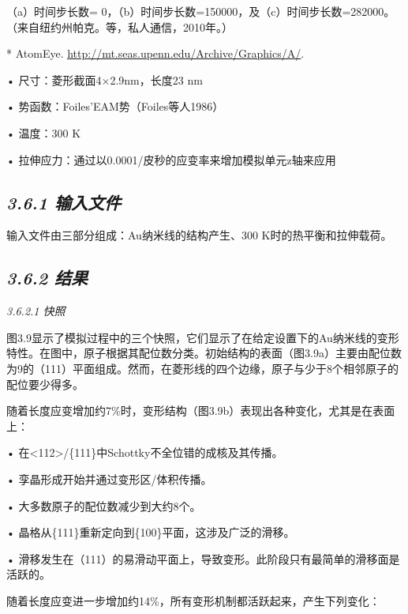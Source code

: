 （a）时间步长数=
0，（b）时间步长数=150000，及（c）时间步长数=282000。（来自纽约州帕克。等，私人通信，2010年。）

* AtomEye.
\href{http://mt.seas.upenn.edu/Archive/Graphics/A/}{\underline{http://mt.seas.upenn.edu/Archive/Graphics/A/}}.

• 尺寸：菱形截面4×2.9nm，长度23 nm

• 势函数：Foiles'EAM势（Foiles等人1986）

• 温度：300 K

• 拉伸应力：通过以0.0001/皮秒的应变率来增加模拟单元z轴来应用

\hypertarget{ux8f93ux5165ux6587ux4ef6-4}{%
\subsection{\texorpdfstring{\emph{3.6.1
输入文件}}{3.6.1 输入文件}}\label{ux8f93ux5165ux6587ux4ef6-4}}

输入文件由三部分组成：Au纳米线的结构产生、300 K时的热平衡和拉伸载荷。



\hypertarget{ux7ed3ux679c-5}{%
\subsection{\texorpdfstring{\emph{3.6.2
结果}}{3.6.2 结果}}\label{ux7ed3ux679c-5}}

\emph{3.6.2.1 快照}

图3.9显示了模拟过程中的三个快照，它们显示了在给定设置下的Au纳米线的变形特性。在图中，原子根据其配位数分类。初始结构的表面（图3.9a）主要由配位数为9的（111）平面组成。然而，在菱形线的四个边缘，原子与少于8个相邻原子的配位要少得多。

随着长度应变增加约7\%时，变形结构（图3.9b）表现出各种变化，尤其是在表面上：

• 在\textless112\textgreater/\{111\}中Schottky不全位错的成核及其传播。

• 孪晶形成开始并通过变形区/体积传播。

• 大多数原子的配位数减少到大约8个。

• 晶格从\{111\}重新定向到\{100\}平面，这涉及广泛的滑移。

•
滑移发生在（111）的易滑动平面上，导致变形。此阶段只有最简单的滑移面是活跃的。

随着长度应变进一步增加约14\%，所有变形机制都活跃起来，产生下列变化：

